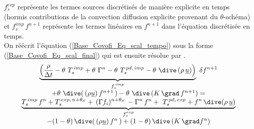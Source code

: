 $f_s^{exp}$ repr\'{e}sente les termes sources discr\'etis\'es de mani\`ere explicite
en temps (hormis contributions de la convection diffusion explicite provenant du
$\theta$-sch\'ema) et $f_s^{imp}\,f^{n+1}$ repr\'esente les termes lin\'eaires
en $f^{n+1}$ dans l'\'equation discr\'etis\'ee en temps.\\
On r\'{e}\'{e}crit l'\'{e}quation (\ref{Base_Covofi_Eq_scal_tempo}) sous la forme (\ref{Base_Covofi_Eq_scal_final})
qui est ensuite r\'{e}solue par .
\begin{equation}
\label{Base_Covofi_Eq_scal_final}
\begin{array}{c}
\displaystyle
\underbrace{\left(\frac {\rho}{\Delta t}- \theta\,\, T_s^{\,imp}+ \theta\,\,
\Gamma^{n} -\theta\,\, T_s^{\,pd,\,imp} - \theta\,\,
\dive\,(\rho\,\underline{u})\right)}_{\text {$f_s^{\,imp}$}}\ \delta f^{n+1}
\\
+\theta\,\, \dive(\,(\rho \underline{u})\,f^{n+1}\,)
-\theta\,\, \dive\,(K\,\grad \,f^{n+1}) = \\
\underbrace{T_s^{\,imp}\,f^n +  T_s^{\,exp,\,n+\theta_S}
+\,(\Gamma f_i)^{n+\theta_S}\, - \Gamma^{n}\,f^n +\ T_s^{\,pd,\,exp} +
 f^{n}\,\dive(\rho\,\underline{u})}_{\text{$f_s^{exp}$}}\\
-(1-\theta)\,\dive(\,(\rho \underline{u})\,f^{n}\,)
+(1-\theta)\,\dive\,(K\,\grad f^{n})
\end{array}
\end{equation}
\\


